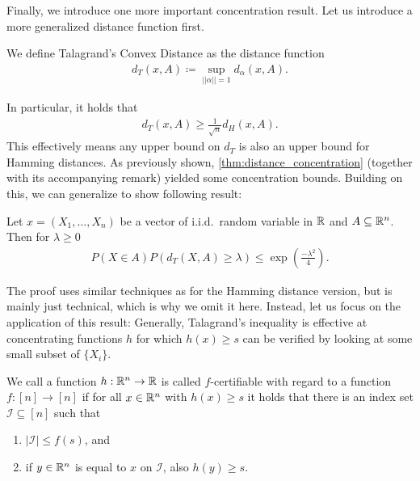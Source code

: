 Finally, we introduce one more important concentration result.
Let us introduce a more generalized distance function first.
\begin{definition}
    We define Talagrand's Convex Distance as the distance function
    \begin{align*}
        d_T(x,A) \coloneqq \sup_{||\alpha||=1}d_\alpha(x,A).
    \end{align*}
\end{definition}
In particular, it holds that
\begin{align}
    d_T(x,A) \geq \frac{1}{\sqrt{n}}d_H(x,A).
\end{align}
This effectively means any upper bound on $d_T$ is also an upper bound for Hamming distances.
As previously shown, \autoref{thm:distance_concentration} (together with its accompanying remark) yielded some concentration bounds.
Building on this, we can generalize to show following result:
\begin{theorem}
    Let $x=(X_1, \dots, X_n)$ be a vector of i.i.d.~random variable in $\mathbb{R}$ and
    $A \subseteq \mathbb{R}^n$.
    Then for $\lambda \geq 0$
    \begin{align*}
        P(X \in A)P(d_T(X,A) \geq \lambda) \leq \exp\left(\frac{-\lambda^2}{4}\right).
    \end{align*}
\end{theorem}
The proof uses similar techniques as for the Hamming distance version, but is mainly just technical, which is why we omit it here.
Instead, let us focus on the application of this result:
Generally, Talagrand's inequality is effective at concentrating functions $h$
for which $h(x) \geq s$ can be verified by looking at some small subset of $\{X_i\}$.
\begin{definition}
    We call a function $h: \mathbb{R}^n \rightarrow \mathbb{R}$ is called $f$-certifiable
    with regard to a function $f: [n] \rightarrow [n]$ if
    for all $x \in \mathbb{R}^n$ with $h(x) \geq s$ it holds that there is an index set
    $\mathcal{I} \subseteq [n]$ such that
    \begin{enumerate}
        \item $|\mathcal I| \leq f(s)$, and
        \item if $y \in \mathbb{R}^n$ is equal to $x$ on $\mathcal I$, also $h(y) \geq s$.
    \end{enumerate}
\end{definition}
